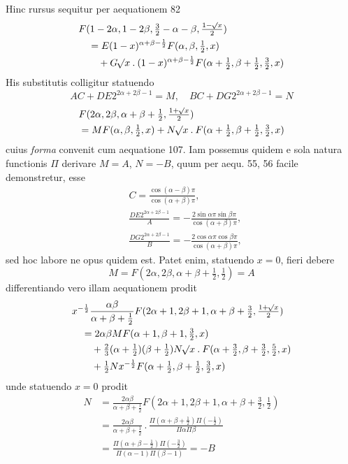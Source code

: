 Hinc rursus sequitur per aequationem 82
\[
\begin{aligned}
&F(1-2\alpha,1-2\beta,\tfrac32-\alpha-\beta,\tfrac{1-\mathord{{}^{}\!\surd}x}2)\\
&\quad=E(1-x)^{\alpha+\beta-\frac12}F(\alpha,\beta,\tfrac12,x)\\&\qquad+G\mathord{{}^{}\!\surd}x\mathbin{.}(1-x)^{\alpha+\beta-\frac12}F(\alpha+\tfrac12,\beta+\tfrac12,\tfrac32,x)
\end{aligned}
\]
His substitutis colligitur statuendo
\[
AC+DE2^{2\alpha+2\beta-1}=M,\quad BC+DG2^{2\alpha+2\beta-1}=N
\]
\[
\begin{aligned}&F(2\alpha,2\beta,\alpha+\beta+\tfrac12,\tfrac{1+\mathord{{}^{}\!\surd}x}2)\\&=MF(\alpha,\beta,\tfrac12,x)+N\mathord{{}^{}\!\surd}x\mathbin{.}F(\alpha+\tfrac12,\beta+\tfrac12,\tfrac32,x)\end{aligned}
\]
cuius \textit{forma} convenit cum aequatione 107. Iam possemus quidem e sola natura
functionis $\Pi$ derivare $M=A$, $N=-B$, quum per aequ. 55, 56 facile demonstretur, esse
\[
\begin{aligned}&C=\frac{\cos(\alpha-\beta)\pi}{\cos(\alpha+\beta)\pi},\\&
\frac{DE2^{2\alpha+2\beta-1}}A=-\frac{2\sin\alpha\pi\sin\beta\pi}{\cos(\alpha+\beta)\pi},\\&
\frac{DG2^{2\alpha+2\beta-1}}B=-\frac{2\cos\alpha\pi\cos\beta\pi}{\cos(\alpha+\beta)\pi},\end{aligned}
\]
sed hoc labore ne opus quidem est. Patet enim, statuendo $x=0$, fieri debere
\[
M=F(2\alpha,2\beta,\alpha+\beta+\tfrac12,\tfrac12)=A
\]
differentiando vero illam aequationem prodit
\[
\begin{aligned}
&x^{-\frac12}\frac{\alpha\beta}{\alpha+\beta+\tfrac12}F(2\alpha+1,2\beta+1,\alpha+\beta+\tfrac32,\tfrac{1+\mathord{{}^{}\!\surd}x}2)\\
&\quad=2\alpha\beta MF(\alpha+1,\beta+1,\tfrac32,x)\\
&\qquad+\tfrac23(\alpha+\tfrac12)(\beta+\tfrac12)N\mathord{{}^{}\!\surd}x\mathbin{.}F(\alpha+\tfrac32,\beta+\tfrac32,\tfrac52,x)\\&\qquad+\tfrac12Nx^{-\frac12}F(\alpha+\tfrac12,\beta+\tfrac12,\tfrac32,x)
\end{aligned}
\]
unde statuendo $x=0$ prodit
\[
\begin{aligned}
N&=\frac{2\alpha\beta}{\alpha+\beta+\tfrac12}F(2\alpha+1,2\beta+1,\alpha+\beta+\tfrac32,\tfrac12)\\
&=\frac{2\alpha\beta}{\alpha+\beta+\tfrac12}\mathbin{.}\frac{\Pi(\alpha+\beta+\tfrac12)\Pi(-\tfrac12)}{\Pi\alpha\Pi\beta}\\
&=\frac{\Pi(\alpha+\beta-\tfrac12)\Pi(-\tfrac32)}{\Pi(\alpha-1)\Pi(\beta-1)}=-B
\end{aligned}
\]
